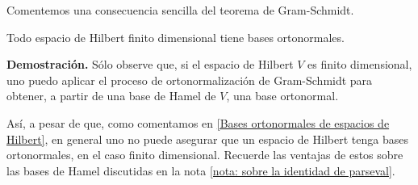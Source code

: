 
\QEDB
\vspace{0.2cm}

Comentemos una consecuencia sencilla del teorema
de Gram-Schmidt. 

\begin{cor}
Todo espacio de Hilbert finito dimensional tiene 
bases ortonormales.
\end{cor}
\noindent
\textbf{Demostración.}
Sólo observe que, si el espacio de
Hilbert $V$ es finito dimensional, uno puedo aplicar
el proceso de ortonormalización de Gram-Schmidt para
obtener, a partir de una base de Hamel de $V$,
una base ortonormal. 
\QEDB
\vspace{0.2cm}

Así, a pesar de que, como comentamos en 
\ref{Bases ortonormales de espacios de Hilbert}, 
en general uno no puede asegurar que un espacio de 
Hilbert tenga bases ortonormales, en el caso finito dimensional.
Recuerde las ventajas
de estos sobre las bases de Hamel discutidas
en la nota \ref{nota: sobre la identidad de parseval}.



